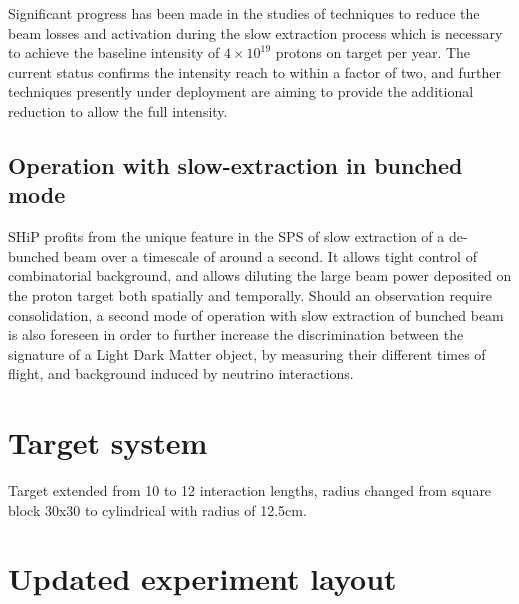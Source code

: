 Significant progress has been made in the studies of techniques to reduce the beam losses 
and activation during the slow extraction process which is necessary to achieve the baseline 
intensity of $4\times 10^{19}$ protons on target per year. The current status confirms the 
intensity reach to within a factor of two, and further techniques presently under deployment 
are  aiming to provide the additional reduction to allow the full intensity.

\subsection{Operation with slow-extraction in bunched mode}

SHiP profits from the unique feature in the SPS of slow extraction of a de-bunched beam over a timescale of around a second. It allows tight control of combinatorial background, and allows diluting the large beam power deposited on the proton target both spatially and temporally. Should an observation require consolidation, a second mode of operation with slow extraction of bunched beam is also foreseen in order to further increase the discrimination between the signature of a Light Dark Matter object, by measuring their different times of flight,  
and background induced by neutrino interactions.

\section{Target system}

Target extended from 10 to 12 interaction lengths, radius changed from square block 30x30 to cylindrical with radius of 12.5cm.


\section{Updated experiment layout}

